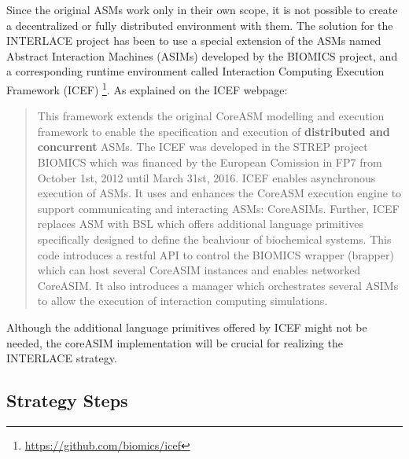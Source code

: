 Since the original ASMs work only in their own scope, it is not possible to create a decentralized or fully distributed environment with them. The solution for the INTERLACE project has been to use a special extension of the ASMs named Abstract Interaction Machines (ASIMs) developed by the BIOMICS project, and a corresponding runtime environment called Interaction Computing Execution Framework (ICEF) \footnote{\url{https://github.com/biomics/icef}}. As explained on the ICEF webpage:
\begin{quote}
\vspace{-0.3cm}
This framework extends the original CoreASM modelling and execution framework to enable the specification and execution of \textbf{distributed and concurrent} ASMs. The ICEF was developed in the STREP project BIOMICS which was financed by the European Comission in FP7 from October 1st, 2012 until March 31st, 2016. ICEF enables asynchronous execution of ASMs. It uses and enhances the CoreASM execution engine to support communicating and interacting ASMs: CoreASIMs. Further, ICEF replaces ASM with BSL which offers additional language primitives specifically designed to define the beahviour of biochemical systems. This code introduces a restful API to control the BIOMICS wrapper (brapper) which can host several CoreASIM instances and enables networked CoreASIM. It also introduces a manager which orchestrates several ASIMs to allow the execution of interaction computing simulations.
\end{quote}

Although the additional language primitives offered by ICEF might not be needed, the coreASIM implementation will be crucial for realizing the INTERLACE strategy.

\subsection{Strategy Steps}\label{subsection-strategy-steps}

